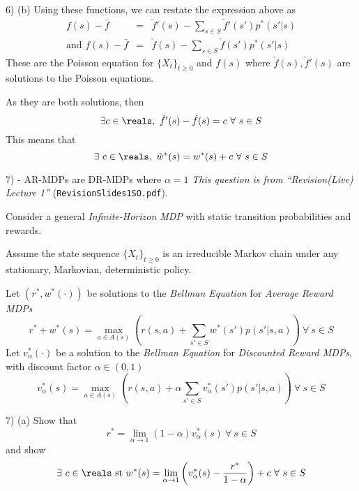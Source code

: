 \documentclass[11pt,a4paper]{article}
\begin{document}
\begin{answer}{6) (b)}
  Using these functions, we can restate the expression above as
  \[\begin{array}{rcl}
    f(s)-\bar{f}&=&\check{f}'(s)-\sum_{s\in S}\check{f}'(s')p^*(s'|s)\\
    \text{and }f(s)-\bar{f}&=&\check{f}(s)-\sum_{s\in S}\check{f}(s')p^*(s'|s)
  \end{array}\]
  These are the Poisson equation for $\{X_t\}_{t\geq0}$ and $f(s)$ where $\check{f}(s),\check{f}'(s)$ are solutions to the Poisson equations.
  \par As they are both solutions, then
  \[ \exists c\in\reals,\ \check{f}'(s)-\check{f}(s)=c\ \forall\ s\in S \]
  This means that
  \[ \exists\ c\in\reals,\  \tilde{w}^*(s)=w^*(s)+c\ \forall\ s\in S \]
\end{answer}

\newpage
\begin{question}{7) - AR-MDPs are DR-MDPs where $\alpha=1$}
  \textit{This question is from ``Revision(Live) Lecture 1''} (\texttt{RevisionSlides1SO.pdf}).
  \par Consider a general \textit{Infinite-Horizon MDP} with static transition probabilities and rewards.
  \par Assume the state sequence $\{X_t\}_{t\geq0}$ is an irreducible Markov chain under any stationary, Markovian, deterministic policy.
  \par Let $(r^*,w^*(\cdot))$ be solutions to the \textit{Bellman Equation} for \textit{Average Reward MDPs}
  \[ r^*+w^*(s)=\max_{a\in A(s)}\left(r(s,a)+\sum_{s'\in S}w^*(s')p(s'|s,a)\right)\ \forall\ s\in S \]
  Let $v_\alpha^*(\cdot)$ be a solution to the \textit{Bellman Equation} for \textit{Discounted Reward MDPs}, with discount factor $\alpha\in(0,1)$
  \[ v_\alpha^*(s)=\max_{a\in A(s)}\left(r(s,a)+\alpha\sum_{s'\in S}v_\alpha^*(s')p(s'|s,a)\right)\ \forall\ s\in S \]
\end{question}

\begin{question}{7) (a)}
  Show that
  \[ r^*=\lim_{\alpha\to1}(1-\alpha)v_\alpha^*(s)\ \forall\ s\in S \]
  and show
  \[ \exists\ c\in\reals\text{ st }w^*(s)=\lim_{\alpha\to1}\left(v_\alpha^*(s)-\frac{r^*}{1-\alpha}\right)+c\ \forall\ s\in S \]
\end{question}
\end{document}
